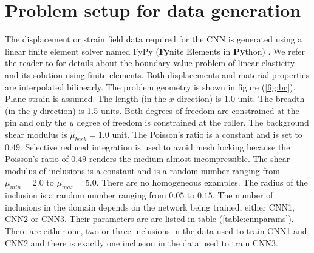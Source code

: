 \documentclass[12pt]{article}
\begin{document}
\section{\label{sect:probsetup}Problem setup for data generation}
The displacement or strain field data required for the CNN is generated using a linear finite element solver named FyPy (\textbf{Fy}nite Elements in \textbf{Py}thon) \cite{misc:fypy}. We refer the reader to \cite{book:hugheslinear,book:fishbelytschko,book:segelmathcont} for details about the boundary value problem of linear elasticity and its solution using finite elements. Both displacements and material properties are interpolated bilinearly. The problem geometry is shown in figure (\ref{fig:bc}). Plane strain is assumed. The length (in the $x$ direction) is $1.0$ unit. The breadth (in the $y$ direction) is 1.5 units. Both degrees of freedom are constrained at the pin and only the $y$ degree of freedom is constrained at the roller. The background shear modulus is $\mu_{back}=1.0$ unit. The Poisson's ratio is a constant and is set to $0.49$. Selective reduced integration is used to avoid mesh locking because the Poisson's ratio of $0.49$ renders the medium almost incompressible. The shear modulus of inclusions is a constant and is a random number ranging from $\mu_{min}=2.0$ to $\mu_{max}=5.0$. There are no homogeneous examples. The radius of the inclusion is a random number ranging from $0.05$ to $0.15$. The number of inclusions in the domain depends on the network being trained, either CNN1, CNN2 or CNN3. Their parameters are are listed in table (\ref{table:cnnparams}). There are either one, two or three inclusions in the data used to train CNN1 and CNN2 and there is exactly one inclusion in the data used to train CNN3.
\end{document}
